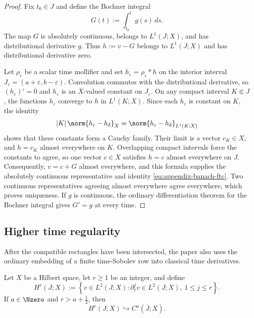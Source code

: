 \begin{proof}
Fix \(t_0\in J\) and define the Bochner integral
\[
 G(t):=\int_{t_0}^tg(s)\,ds.
\]
The map \(G\) is absolutely continuous, belongs to \(L^1(J;X)\), and has distributional derivative \(g\).
Thus \(h:=v-G\) belongs to \(L^1(J;X)\) and has distributional derivative zero.

Let \(\rho_\varepsilon\) be a scalar time mollifier and set \(h_\varepsilon=\rho_\varepsilon*h\) on the interior interval \(J_\varepsilon=(a+\varepsilon,b-\varepsilon)\).
Convolution commutes with the distributional derivative, so \((h_\varepsilon)'=0\) and \(h_\varepsilon\) is an \(X\)-valued constant on \(J_\varepsilon\).
On any compact interval \(K\Subset J\), the functions \(h_\varepsilon\) converge to \(h\) in \(L^1(K;X)\).
Since each \(h_\varepsilon\) is constant on \(K\), the identity
\[
 |K|\,\norm{h_\varepsilon-h_\delta}_X
 =\norm{h_\varepsilon-h_\delta}_{L^1(K;X)}
\]
shows that these constants form a Cauchy family.
Their limit is a vector \(c_K\in X\), and \(h=c_K\) almost everywhere on \(K\).
Overlapping compact intervals force the constants to agree, so one vector \(c\in X\) satisfies \(h=c\) almost everywhere on \(J\).
Consequently, \(v=c+G\) almost everywhere, and this formula supplies the absolutely continuous representative and identity \eqref{eq:appendix-banach-ftc}.
Two continuous representatives agreeing almost everywhere agree everywhere, which proves uniqueness.
If \(g\) is continuous, the ordinary differentiation theorem for the Bochner integral gives \(G'=g\) at every time.
\end{proof}

\subsection{Higher time regularity}

After the compatible rectangles have been intersected, the paper also uses the ordinary embedding of a finite time-Sobolev row into classical time derivatives.

\begin{lemma}
Let \(X\) be a Hilbert space, let \(r\ge1\) be an integer, and define
\[
 H^r(J;X)
 :=
 \left\{v\in L^2(J;X):\partial_t^jv\in L^2(J;X),\ 1\le j\le r\right\}.
\]
If \(a\in\Nzero\) and \(r>a+\frac12\), then
\begin{equation}
 H^r(J;X)\hookrightarrow C^a(\overline J;X).
 \label{eq:appendix-time-embedding}
\end{equation}
\end{lemma}

